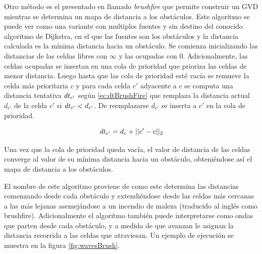 Otro método es el presentado en \cite{choset2005principles} llamado
\emph{brushfire} que permite construir un GVD mientras se determina un mapa de
distancia a los obstáculos.
Este algoritmo se puede ver como una variante con multiples fuentes y sin
destino del conocido algoritmo de Dijkstra, en el que las fuentes son los
obstáculos y la distancia calculada es la mínima distancia hacia un obstáculo.
Se comienza inicializando las distancias de las celdas libres con $\infty$ y
las ocupadas con $0$.  Adicionalmente, las celdas ocupadas se insertan en una
cola de prioridad que prioriza las celdas de menor distancia. Luego hasta que
las cola de prioridad esté vacía se remueve la celda más prioritaria $c$ y para
cada celda $c'$ adyacente a $c$ se computa una distancia tentativa $\mathit{dt}_{c'}$
según \eqref{ec:dtBrushFire} que remplaza la distancia actual $d_{c'}$ de la
celda $c'$ si $\mathit{dt}_{c'}<d_{c'}$. De reemplazarse $d_{c'}$ se inserta a $c'$ en
la cola de prioridad. 

\begin{equation}\label{ec:dtBrushFire}
  \mathit{dt}_{c'} = d_c+||c'-c||_2
\end{equation}

Una vez que la cola de prioridad queda vacía, el valor de distancia de las celdas converge al valor de su mínima distancia hacia un obstáculo, obteniéndose así el mapa de distancia a los obstáculos. 

El nombre de este algoritmo proviene de como este determina las distancias comenzando desde cada obstáculo y extendiéndose desde las celdas más cercanas a las más lejanas asemejándose a un incendio de maleza (traducido al inglés como brushfire). Adicionalmente el algoritmo también puede interpretarse como ondas que parten desde cada obstáculo, y a medida de que avanzan le asignan la distancia recorrida a las celdas que atraviesan. Un ejemplo de ejecución se muestra en la figura \ref{fig:wavesBrush}.  

